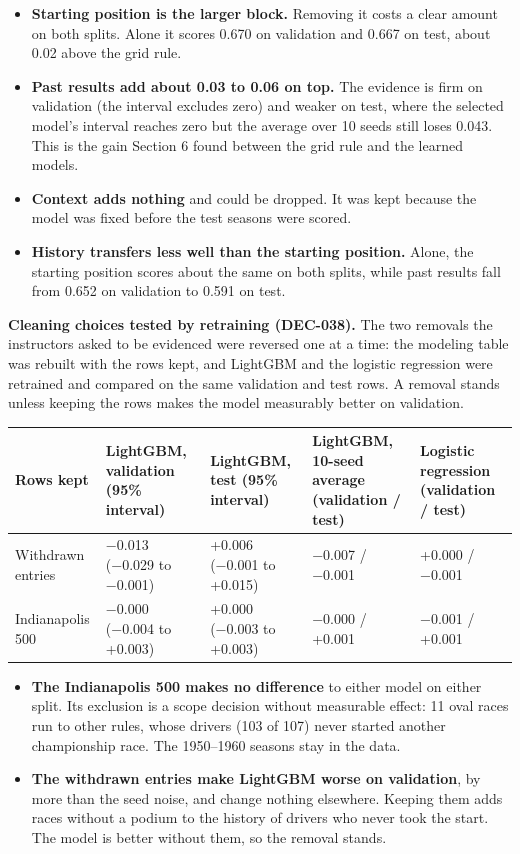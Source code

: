 \documentclass[11pt,a4paper]{article}
\begin{document}
\begin{itemize}
\item \textbf{Starting position is the larger block.} Removing it costs a clear amount on both splits. Alone it scores 0.670 on validation and 0.667 on test, about 0.02 above the grid rule.
\item \textbf{Past results add about 0.03 to 0.06 on top.} The evidence is firm on validation (the interval excludes zero) and weaker on test, where the selected model's interval reaches zero but the average over 10 seeds still loses 0.043. This is the gain Section 6 found between the grid rule and the learned models.
\item \textbf{Context adds nothing} and could be dropped. It was kept because the model was fixed before the test seasons were scored.
\item \textbf{History transfers less well than the starting position.} Alone, the starting position scores about the same on both splits, while past results fall from 0.652 on validation to 0.591 on test.
\end{itemize}

\textbf{Cleaning choices tested by retraining (DEC-038).} The two removals the instructors asked to be evidenced were reversed one at a time: the modeling table was rebuilt with the rows kept, and LightGBM and the logistic regression were retrained and compared on the same validation and test rows. A removal stands unless keeping the rows makes the model measurably better on validation.

{\small
\begin{xltabular}{\linewidth}{>{\raggedright\arraybackslash}X>{\raggedright\arraybackslash}X>{\raggedright\arraybackslash}X>{\raggedright\arraybackslash}X>{\raggedright\arraybackslash}X}
\toprule
\textbf{Rows kept} & \textbf{LightGBM, validation (95\% interval)} & \textbf{LightGBM, test (95\% interval)} & \textbf{LightGBM, 10-seed average (validation / test)} & \textbf{Logistic regression (validation / test)} \\
\midrule
\endhead
Withdrawn entries & −0.013 (−0.029 to −0.001) & +0.006 (−0.001 to +0.015) & −0.007 / −0.001 & +0.000 / −0.001 \\
Indianapolis 500 & −0.000 (−0.004 to +0.003) & +0.000 (−0.003 to +0.003) & −0.000 / +0.001 & −0.001 / +0.001 \\
\bottomrule
\end{xltabular}
}

\begin{itemize}
\item \textbf{The Indianapolis 500 makes no difference} to either model on either split. Its exclusion is a scope decision without measurable effect: 11 oval races run to other rules, whose drivers (103 of 107) never started another championship race. The 1950–1960 seasons stay in the data.
\item \textbf{The withdrawn entries make LightGBM worse on validation}, by more than the seed noise, and change nothing elsewhere. Keeping them adds races without a podium to the history of drivers who never took the start. The model is better without them, so the removal stands.
\end{itemize}
\end{document}
